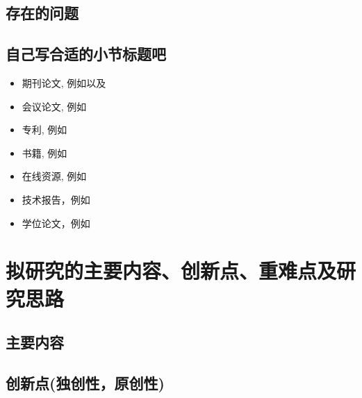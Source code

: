 \documentclass{proposal}
\begin{document}
\begin{foundation}
\zhlipsum[1]

\subsection{存在的问题}

\zhlipsum[1]

\subsection{自己写合适的小节标题吧}

\zhlipsum[1]

\begin{itemize}
	\item[\ding{172}] 期刊论文, 例如\cite{XmDeng2007,Brown1984,ZHY2017RS,ZHY2012manifold}以及\cite{Wing2006CT}
	\item[\ding{173}] 会议论文, 例如\cite{Geyer1999,Branislav2004}
	\item[\ding{174}] 专利, 例如\cite{LongMA2015P}
	\item[\ding{175}] 书籍, 例如\cite{CDIO2014,ZHY2022}
	\item[\ding{176}] 在线资源, 例如\cite{SFMedu,OpenMVS,HainnuThesis}
	\item[\ding{177}] 技术报告，例如\cite{Sussman2005}
	\item[\ding{178}] 学位论文，例如\cite{ZHY2002,Xue2006,lzj-zhy-MS-thesis-2018,zls-zhy-MS-thesis-2016,zhy-2011-disertation}

\end{itemize}
\ckwx

\SectionEndLine				   %

\section{拟研究的主要内容、创新点、重难点及研究思路}

\subsection{主要内容}

\zhlipsum[2]

\subsection{创新点(独创性，原创性)}


\end{foundation}
\end{document}
